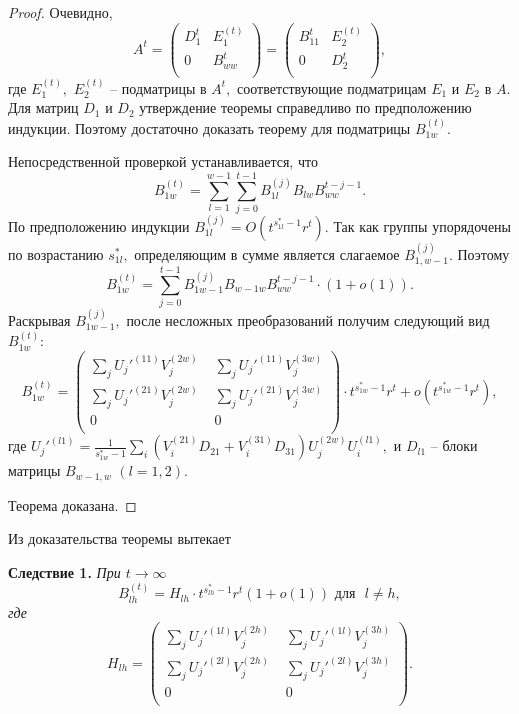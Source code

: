 \documentclass[10pt]{article}
\begin{document}
\begin{proof}
Очевидно, 
$$
A^t=\left(
\begin{array}{cc} 
D_{1}^t  & E_1^{(t)} \\
0 &    B_{w w}^t \\
\end{array}
\right)=
\left(
\begin{array}{cc} 
B_{11}^t  & E_2^{(t)} \\
0 &    D_{2}^t \\
\end{array}
\right),
$$
где $E_1^{(t)},$ $E_2^{(t)}$ -- подматрицы в $A^t,$ соответствующие подматрицам $E_1$ и $E_2$ в $A.$
Для матриц $D_1$ и $D_2$ утверждение теоремы справедливо по предположению индукции. Поэтому достаточно доказать теорему для подматрицы $B_{1w}^{(t)}.$

Непосредственной проверкой устанавливается, что 
$$
B_{1w}^{(t)}=
\sum_{l=1}^{w-1} \sum_{j=0}^{t-1}B_{1l}^{(j)}B_{lw} B_{ww}^{t-j-1}.
$$
По предположению индукции $B_{1l}^{(j)}=O\left(t^{s_{1l}^*-1}r^t \right).$ Так как группы упорядочены по возрастанию $s_{1l}^*,$ 
определяющим в сумме является слагаемое $B_{1,w-1}^{(j)}.$ Поэтому
$$
B_{1w}^{(t)}=\sum_{j=0}^{t-1}B_{1w-1}^{(j)}B_{w-1w} B_{ww}^{t-j-1}\cdot (1+o(1)).
$$
Раскрывая $B_{1w-1}^{(j)},$ после несложных преобразований получим следующий вид $B_{1w}^{(t)}:$
$$
B_{1w}^{(t)}=
\left(
\begin{array}{cc} 
\sum_{j}U_j'^{(11)}V_j^{(2w)} \,\,  & \sum_{j}U_j'^{(11)}V_j^{(3w)}\\
\sum_{j}U_j'^{(21)}V_j^{(2w)} \,\, & \sum_{j}U_j'^{(21)}V_j^{(3w)} \\
0 \,\,& 0 \\
\end{array}
\right) \cdot t^{s_{1w}^*-1} r^t +o(t^{s_{1w}^*-1}r^t),
$$
где $U_j'^{(l1)}=\frac{1}{s_{1w}^*-1} \sum _{i}\left(V_i^{(21)}D_{21}+V_i^{(31)}D_{31}\right)U_j^{(2w)}U_{i}^{(l1)},$ и $D_{l1}$ -- блоки матрицы $B_{w-1, w}$ $(l=1,2).$

Теорема доказана.
\end{proof}

Из доказательства теоремы вытекает 

\medskip

{\bf Следствие 1.} 
{\it При $t\rightarrow \infty$
$$
B_{lh}^{(t)}=H_{lh} \cdot t^{s_{lh}^*-1} r^t (1+o(1)) \,\,\mbox{для  } \,\, l \ne h, 
$$
где
$$
H_{lh}=
\left(
\begin{array}{cc} 
\sum_{j}U_j'^{(1l)}V_j^{(2h)} \,\,  & \sum_{j}U_j'^{(1l)}V_j^{(3h)}\\
\sum_{j}U_j'^{(2l)}V_j^{(2h)} \,\, & \sum_{j}U_j'^{(2l)}V_j^{(3h)} \\
0 \,\,& 0 \\
\end{array}
\right).
$$
}
\end{document}
